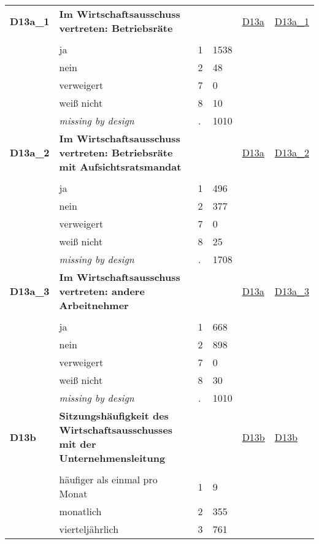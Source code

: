\begin{longtable}{| L{2.45cm} | L{6cm} | C{1.5cm} | R{1cm} | C{2.25cm} | C{2.25cm} |}
   \midrule
\textbf{D13a\_1}\label{var:D13a:1} & \textbf{Im Wirtschaftsausschuss vertreten: Betriebsräte} &  &  & \hyperref[D13a]{D13a} & \hyperref[var:suf:D13a:1]{D13a\_1} \\ 
   &  &  &  &  &  \\ 
   & ja & 1 & 1538 &  &  \\ 
   & nein & 2 & 48 &  &  \\ 
   & verweigert & 7 & 0 &  &  \\ 
   & weiß nicht & 8 & 10 &  &  \\ 
   & \textit{missing by design} & \textit{.} & 1010 &  &  \\ 
   \midrule
\textbf{D13a\_2}\label{var:D13a:2} & \textbf{Im Wirtschaftsausschuss vertreten: Betriebsräte mit Aufsichtsratsmandat} &  &  & \hyperref[D13a]{D13a} & \hyperref[var:suf:D13a:2]{D13a\_2} \\ 
   &  &  &  &  &  \\ 
   & ja & 1 & 496 &  &  \\ 
   & nein & 2 & 377 &  &  \\ 
   & verweigert & 7 & 0 &  &  \\ 
   & weiß nicht & 8 & 25 &  &  \\ 
   & \textit{missing by design} & \textit{.} & 1708 &  &  \\ 
   \midrule
\textbf{D13a\_3}\label{var:D13a:3} & \textbf{Im Wirtschaftsausschuss vertreten: andere Arbeitnehmer} &  &  & \hyperref[D13a]{D13a} & \hyperref[var:suf:D13a:3]{D13a\_3} \\ 
   &  &  &  &  &  \\ 
   & ja & 1 & 668 &  &  \\ 
   & nein & 2 & 898 &  &  \\ 
   & verweigert & 7 & 0 &  &  \\ 
   & weiß nicht & 8 & 30 &  &  \\ 
   & \textit{missing by design} & \textit{.} & 1010 &  &  \\ 
   \midrule
\textbf{D13b}\label{var:D13b} & \textbf{Sitzungshäufigkeit des Wirtschaftsausschusses mit der Unternehmensleitung} &  &  & \hyperref[D13b]{D13b} & \hyperref[var:suf:D13b]{D13b} \\ 
   &  &  &  &  &  \\ 
   & häufiger als einmal pro Monat & 1 & 9 &  &  \\ 
   & monatlich & 2 & 355 &  &  \\ 
   & vierteljährlich & 3 & 761 &  &  \\ 

\end{longtable}
